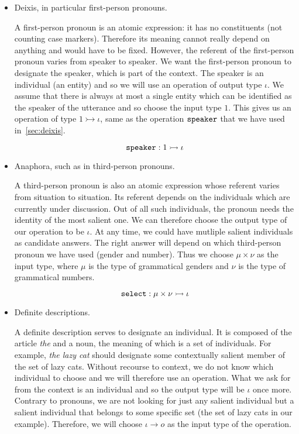 \begin{itemize}
\item Deixis, in particular first-person pronouns.

  A first-person pronoun is an atomic expression: it has no constituents
  (not counting case markers). Therefore its meaning cannot really depend
  on anything and would have to be fixed. However, the referent of the
  first-person pronoun varies from speaker to speaker. We want the
  first-person pronoun to designate the speaker, which is part of the
  context. The speaker is an individual (an entity) and so we will use an
  operation of output type $\iota$. We assume that there is always at most
  a single entity which can be identified as the speaker of the utterance
  and so choose the input type $1$. This gives us an operation of type
  $1 \rightarrowtail \iota$, same as the operation $\mathtt{speaker}$ that we
  have used in~\ref{sec:deixis}.
  
  $$
  \mathtt{speaker} : 1 \rightarrowtail \iota
  $$
  
\item Anaphora, such as in third-person pronouns.

  A third-person pronoun is also an atomic expression whose referent varies
  from situation to situation. Its referent depends on the individuals
  which are currently under discussion. Out of all such individuals, the
  pronoun needs the identity of the most salient one. We can therefore
  choose the output type of our operation to be $\iota$. At any time, we
  could have mutliple salient individuals as candidate answers. The right
  answer will depend on which third-person pronoun we have used (gender and
  number). Thus we choose $\mu \times \nu$ as the input type, where $\mu$
  is the type of grammatical genders and $\nu$ is the type of grammatical
  numbers.
  
  $$
  \mathtt{select} : \mu \times \nu \rightarrowtail \iota
  $$

\item Definite descriptions.
  
  A definite description serves to designate an individual. It is composed
  of the article \emph{the} and a noun, the meaning of which is a set of
  individuals. For example, \emph{the lazy cat} should designate some
  contextually salient member of the set of lazy cats. Without recourse to
  context, we do not know which individual to choose and we will therefore
  use an operation. What we ask for from the context is an individual and
  so the output type will be $\iota$ once more. Contrary to pronouns, we
  are not looking for just any salient individual but a salient individual
  that belongs to some specific set (the set of lazy cats in our
  example). Therefore, we will choose $\iota \to o$ as the input type of
  the operation.
  

\end{itemize}

